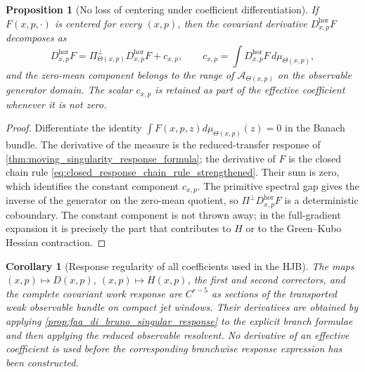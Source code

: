 \documentclass[12pt, letterpaper]{amsart}
\newcommand{\Acal}{\mathcal{A}}
\providecommand{\Piperp}{\Pi^\perp}
\newcommand{\Hor}{\mathrm{hor}}
\theoremstyle{plain}
\newtheorem{proposition}[theorem]{Proposition}
\newtheorem{corollary}[theorem]{Corollary}
\theoremstyle{definition}
\theoremstyle{remark}
\begin{document}
\begin{proposition}[No loss of centering under coefficient differentiation]
\label{prop:no_loss_centering_coefficient_differentiation_strengthened}
If $F(x,p,\cdot)$ is centered for every $(x,p)$, then the covariant derivative
$D_{x,p}^{\Hor}F$ decomposes as
\begin{equation}
\label{eq:centered_derivative_decomposition_strengthened}
    D_{x,p}^{\Hor}F
      =\Piperp_{\Theta(x,p)}D_{x,p}^{\Hor}F
       +c_{x,p},
    \qquad
    c_{x,p}=\int D_{x,p}^{\Hor}F\,d\mu_{\Theta(x,p)},
\end{equation}
and the zero-mean component belongs to the range of
$\Acal_{\Theta(x,p)}$ on the observable generator domain.  The scalar
$c_{x,p}$ is retained as part of the effective coefficient whenever it is not
zero.
\end{proposition}

\begin{proof}
Differentiate the identity
$\int F(x,p,z)d\mu_{\Theta(x,p)}(z)=0$ in the Banach bundle.  The derivative of
the measure is the reduced-transfer response of
\cref{thm:moving_singularity_response_formula}; the derivative of $F$ is the
closed chain rule \eqref{eq:closed_response_chain_rule_strengthened}.  Their
sum is zero, which identifies the constant component $c_{x,p}$.  The primitive
spectral gap gives the inverse of the generator on the zero-mean quotient, so
$\Piperp D_{x,p}^{\Hor}F$ is a deterministic coboundary.  The constant component
is not thrown away; in the full-gradient expansion it is precisely the part
that contributes to $H$ or to the Green--Kubo Hessian contraction.
\end{proof}


\begin{corollary}[Response regularity of all coefficients used in the HJB]
\label{cor:coefficient_response_regular_full}
The maps \((x,p)\mapsto D(x,p)\), \((x,p)\mapsto H(x,p)\), the first and
second correctors, and the complete covariant work response are \(C^{r-5}\) as
sections of the transported weak observable bundle on compact jet windows.
Their derivatives are obtained by applying
\cref{prop:faa_di_bruno_singular_response} to the explicit branch formulae and
then applying the reduced observable resolvent.  No derivative of an effective
coefficient is used before the corresponding branchwise response expression has
been constructed.
\end{corollary}
\end{document}
